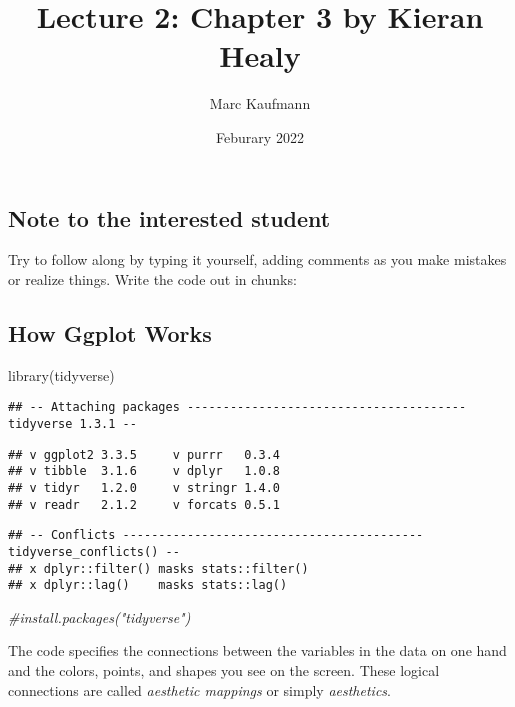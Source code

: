 \documentclass[
]{article}
\title{Lecture 2: Chapter 3 by Kieran Healy}
\author{Marc Kaufmann}
\date{Feburary 2022}
\newenvironment{Shaded}{\begin{snugshade}}{\end{snugshade}}
\newcommand{\CommentTok}[1]{\textcolor[rgb]{0.56,0.35,0.01}{\textit{#1}}}
\newcommand{\FunctionTok}[1]{\textcolor[rgb]{0.00,0.00,0.00}{#1}}
\newcommand{\NormalTok}[1]{#1}
\begin{document}
\maketitle

\hypertarget{note-to-the-interested-student}{%
\subsection{Note to the interested
student}\label{note-to-the-interested-student}}

Try to follow along by typing it yourself, adding comments as you make
mistakes or realize things. Write the code out in chunks:

\hypertarget{how-ggplot-works}{%
\subsection{How Ggplot Works}\label{how-ggplot-works}}

\begin{Shaded}
\begin{Highlighting}[]
\FunctionTok{library}\NormalTok{(tidyverse)}
\end{Highlighting}
\end{Shaded}

\begin{verbatim}
## -- Attaching packages --------------------------------------- tidyverse 1.3.1 --
\end{verbatim}

\begin{verbatim}
## v ggplot2 3.3.5     v purrr   0.3.4
## v tibble  3.1.6     v dplyr   1.0.8
## v tidyr   1.2.0     v stringr 1.4.0
## v readr   2.1.2     v forcats 0.5.1
\end{verbatim}

\begin{verbatim}
## -- Conflicts ------------------------------------------ tidyverse_conflicts() --
## x dplyr::filter() masks stats::filter()
## x dplyr::lag()    masks stats::lag()
\end{verbatim}

\begin{Shaded}
\begin{Highlighting}[]
\CommentTok{\#install.packages("tidyverse")}
\end{Highlighting}
\end{Shaded}

The code specifies the connections between the variables in the data on
one hand and the colors, points, and shapes you see on the screen. These
logical connections are called \emph{aesthetic mappings} or simply
\emph{aesthetics}.
\end{document}
